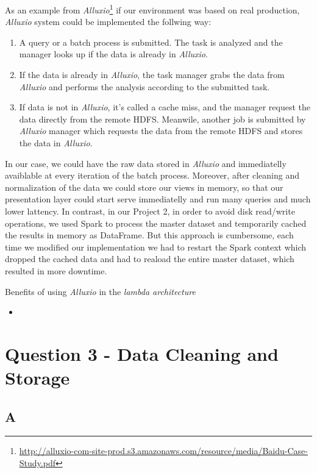 \documentclass[format=acmsmall, review=false, screen=true]{acmart}
\begin{document}
As an example from \textit{Alluxio}\footnote{\url{http://alluxio-com-site-prod.s3.amazonaws.com/resource/media/Baidu-Case-Study.pdf}} if our environment was based on real production, \textit{Alluxio} system could be implemented the follwing way:

\begin{enumerate}
	\item A query or a batch process is submitted. The task is analyzed and the manager looks up if the data is already in \textit{Alluxio}.
	\item If the data is already in \textit{Alluxio}, the task manager grabs the data from \textit{Alluxio} and performs the analysis according to the submitted task.  
	\item If data is not in \textit{Alluxio}, it's called a cache miss, and the manager request the data directly from the remote HDFS. Meanwile, another job is submitted by \textit{Alluxio} manager which requests the data from the remote HDFS and stores the data in \textit{Alluxio}.
\end{enumerate}
 
 In our case, we could have the raw data stored in \textit{Alluxio} and immediatelly avaiblable at every iteration of the batch process. Moreover, after cleaning and normalization of the data we could store our views in memory, so that our presentation layer could start serve immediatelly and run many queries and much lower lattency. In contrast, in our Project 2, in order to avoid disk read/write operations, we used Spark to process the master dataset and temporarily cached the results in memory as DataFrame. But this approach is cumbersome, each time we modified our implementation we had to restart the Spark context which dropped the cached data and had to reaload the entire master dataset, which resulted in more downtime.   

Benefits of using \textit{Alluxio} in the \textit{lambda architecture}
\begin{itemize}
		\item 
\end{itemize}

\section{Question 3 - Data Cleaning and Storage }

\subsection{A}
\end{document}
